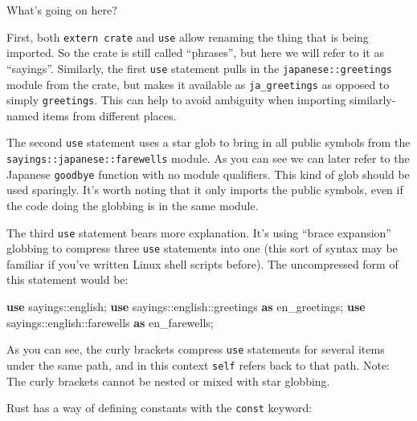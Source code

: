 \documentclass[a4paper,]{book}
\newenvironment{Shaded}{\begin{snugshade}}{\end{snugshade}}
\newcommand{\KeywordTok}[1]{\textcolor[rgb]{0.13,0.29,0.53}{\textbf{{#1}}}}
\newcommand{\NormalTok}[1]{{#1}}
\begin{document}
What's going on here?

First, both \texttt{extern\ crate} and \texttt{use} allow renaming the
thing that is being imported. So the crate is still called ``phrases'',
but here we will refer to it as ``sayings''. Similarly, the first
\texttt{use} statement pulls in the \texttt{japanese::greetings} module
from the crate, but makes it available as \texttt{ja\_greetings} as
opposed to simply \texttt{greetings}. This can help to avoid ambiguity
when importing similarly-named items from different places.

The second \texttt{use} statement uses a star glob to bring in all
public symbols from the \texttt{sayings::japanese::farewells} module. As
you can see we can later refer to the Japanese \texttt{goodbye} function
with no module qualifiers. This kind of glob should be used sparingly.
It's worth noting that it only imports the public symbols, even if the
code doing the globbing is in the same module.

The third \texttt{use} statement bears more explanation. It's using
``brace expansion'' globbing to compress three \texttt{use} statements
into one (this sort of syntax may be familiar if you've written Linux
shell scripts before). The uncompressed form of this statement would be:

\begin{Shaded}
\begin{Highlighting}[]
\KeywordTok{use} \NormalTok{sayings::english;}
\KeywordTok{use} \NormalTok{sayings::english::greetings }\KeywordTok{as} \NormalTok{en_greetings;}
\KeywordTok{use} \NormalTok{sayings::english::farewells }\KeywordTok{as} \NormalTok{en_farewells;}
\end{Highlighting}
\end{Shaded}

As you can see, the curly brackets compress \texttt{use} statements for
several items under the same path, and in this context \texttt{self}
refers back to that path. Note: The curly brackets cannot be nested or
mixed with star globbing.


Rust has a way of defining constants with the \texttt{const} keyword:
\end{document}
